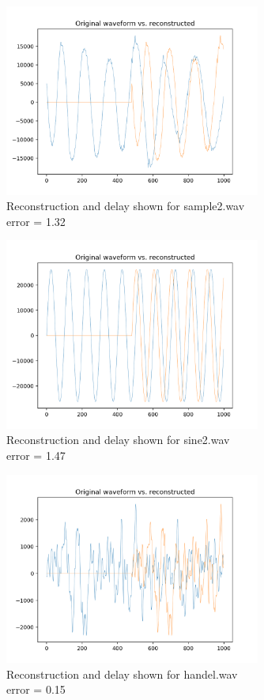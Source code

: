 \documentclass[11pt,a4paper]{article}
\begin{document}
\begin{figure}[ht]
	\centering
	\includegraphics[width=0.75\textwidth]{synthesis/sample2_delay}
	\caption{Reconstruction and delay shown for sample2.wav \\ error = 1.32}
	\label{fig:synthesis_sample2}
\end{figure}

\pagebreak

\begin{figure}[ht]
	\centering
	\includegraphics[width=0.75\textwidth]{synthesis/sine2_delay}
	\caption{Reconstruction and delay shown for sine2.wav \\ error = 1.47}
	\label{fig:synthesis_sine2}
\end{figure}

\begin{figure}[ht]
	\centering
	\includegraphics[width=0.75\textwidth]{synthesis/handel_delay}
	\caption{Reconstruction and delay shown for handel.wav \\ error = 0.15}
	\label{fig:synthesis_handel}
\end{figure}
\end{document}

